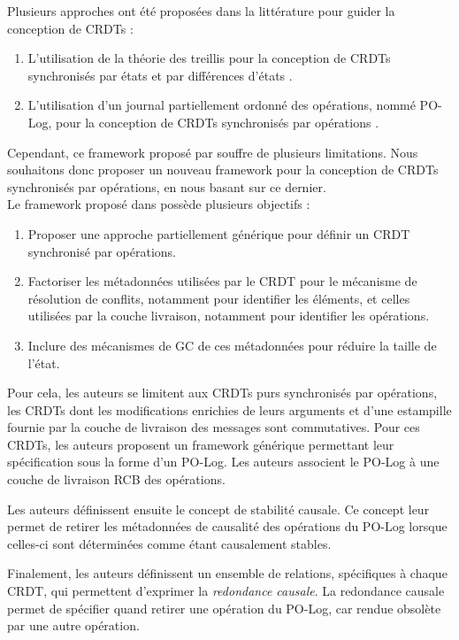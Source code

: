 Plusieurs approches ont été proposées dans la littérature pour guider la conception de \acp{CRDT} :
\begin{enumerate}
    \item L'utilisation de la théorie des treillis pour la conception de \acp{CRDT} synchronisés par états et par différences d'états \cite{shapiro_2011_crdt,enes2019}.
    \item L'utilisation d'un journal partiellement ordonné des opérations, nommé PO-Log, pour la conception de \acp{CRDT} synchronisés par opérations \cite{baquero2017pure}.
\end{enumerate}
Cependant, ce framework proposé par \cite{baquero2017pure} souffre de plusieurs limitations.
Nous souhaitons donc proposer un nouveau framework pour la conception de \acp{CRDT} synchronisés par opérations, en nous basant sur ce dernier.\\

Le framework proposé dans \cite{baquero2017pure} possède plusieurs objectifs :
\begin{enumerate}
    \item Proposer une approche partiellement générique pour définir un \ac{CRDT} synchronisé par opérations.
    \item Factoriser les métadonnées utilisées par le \ac{CRDT} pour le mécanisme de résolution de conflits, notamment pour identifier les éléments, et celles utilisées par la couche livraison, notamment pour identifier les opérations.
    \item Inclure des mécanismes de \ac{GC} de ces métadonnées pour réduire la taille de l'état.
\end{enumerate}

Pour cela, les auteurs se limitent aux \acp{CRDT} purs synchronisés par opérations, \ie les \acp{CRDT} dont les modifications enrichies de leurs arguments et d'une estampille fournie par la couche de livraison des messages sont commutatives.
Pour ces \acp{CRDT}, les auteurs proposent un framework générique permettant leur spécification sous la forme d'un PO-Log.
Les auteurs associent le PO-Log à une couche de livraison \ac{RCB} des opérations.

Les auteurs définissent ensuite le concept de stabilité causale.
Ce concept leur permet de retirer les métadonnées de causalité des opérations du PO-Log lorsque celles-ci sont déterminées comme étant causalement stables.

Finalement, les auteurs définissent un ensemble de relations, spécifiques à chaque \ac{CRDT}, qui permettent d'exprimer la \emph{redondance causale}.
La redondance causale permet de spécifier quand retirer une opération du PO-Log, car rendue obsolète par une autre opération.\\

